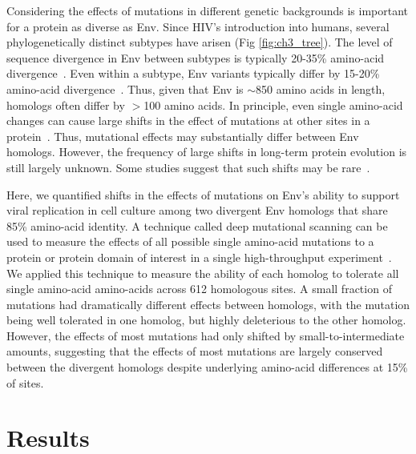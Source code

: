 \documentclass[9pt,lineno]{elife}
\begin{document}
Considering the effects of mutations in different genetic backgrounds is important for a protein as diverse as Env.
Since HIV's introduction into humans, several phylogenetically distinct subtypes have arisen (Fig \ref{fig:ch3_tree}).
The level of sequence divergence in Env between subtypes is typically 20-35\% amino-acid divergence~\cite{korber2001evolutionary}.
Even within a subtype, Env variants typically differ by 15-20\% amino-acid divergence~\cite{korber2001evolutionary}.
Thus, given that Env is $\sim$850 amino acids in length, homologs often differ by $>$100 amino acids.
In principle, even single amino-acid changes can cause large shifts in the effect of mutations at other sites in a protein~\cite{weinreich2006darwinian,ortlund2007crystal,gong2013stability}.
Thus, mutational effects may substantially differ between Env homologs.
However, the frequency of large shifts in long-term protein evolution is still largely unknown.
Some studies suggest that such shifts may be rare~\cite{doud2015site,ashenberg2013mutational}.

Here, we quantified shifts in the effects of mutations on Env's ability to support viral replication in cell culture among two divergent Env homologs that share 85\% amino-acid identity.
A technique called deep mutational scanning can be used to measure the effects of all possible single amino-acid mutations to a protein or protein domain of interest in a single high-throughput experiment~\cite{mclaughlin2012spatial,roscoe2013analyses,firnberg2014comprehensive,olson2014comprehensive,melnikov2014comprehensive,bloom2014experimentally,qi2014quantitative,thyagarajan2014inherent,stiffler2015evolvability,doud2015site,kitzman2015massively,mishra2016systematic,doud2016accurate,mavor2015determination}.
We applied this technique to measure the ability of each homolog to tolerate all single amino-acid amino-acids across 612 homologous sites.
A small fraction of mutations had dramatically different effects between homologs, with the mutation being well tolerated in one homolog, but highly deleterious to the other homolog.
However, the effects of most mutations had only shifted by small-to-intermediate amounts, suggesting that the effects of most mutations are largely conserved between the divergent homologs despite underlying amino-acid differences at 15\% of sites.

\section{Results}
\end{document}
